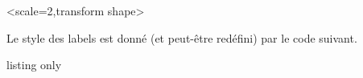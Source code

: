 \documentclass{article}
\begin{document}
\begin{PresentationCode}{}
\TangramTikzAide[Correction,Couleur=teal]<scale=2,transform shape>
\end{PresentationCode}

\begin{PresentationCode}{}
\TangramTikzAide[CorrectionCouleur,Aide=false]
\end{PresentationCode}

Le style des labels est donné (et peut-être redéfini) par le code suivant.

\begin{PresentationCode}{listing only}
\end{PresentationCode}

\pagebreak
\end{document}
